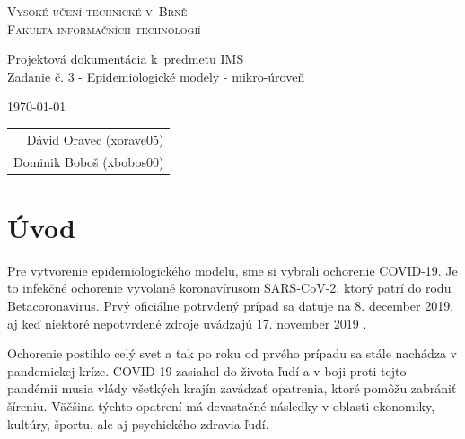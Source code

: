 \documentclass[a4paper, 11pt]{article}
\begin{document}
	\begin{titlepage}
		\begin{center}
			\Huge
			\textsc{Vysoké učení technické v~Brně} \\
			\huge
			\textsc{Fakulta informačních technologií} \\
			\begin{figure}[h]
                \centering
            \end{figure}
			\LARGE
			Projektová dokumentácia k~predmetu IMS \\
			\Huge
			Zadanie č. 3 - Epidemiologické modely - mikro-úroveň
		\end{center}

		{\Large
			\today
			\hfill
			\begin{tabular}{r}
			Dávid Oravec (xorave05) \\
			Dominik Boboš (xbobos00)
			\end{tabular}
		}
	\end{titlepage}
	\newpage
	
	\tableofcontents
	\newpage
	
	\section{Úvod}
	\par Pre vytvorenie epidemiologického modelu, sme si vybrali ochorenie COVID-19. Je to infekčné ochorenie vyvolané koronavírusom SARS-CoV-2, ktorý patrí do rodu Betacoronavirus. Prvý oficiálne potrvdený prípad sa datuje na 8. december 2019, aj keď niektoré nepotvrdené zdroje uvádzajú 17. november 2019 \cite{guardian}.
	\newline
	
	\par Ochorenie postihlo celý svet a tak po roku od prvého prípadu sa stále nachádza v pandemickej kríze. COVID-19 zasiahol do života ľudí a v boji proti tejto pandémii musia vlády všetkých krajín zavádzať opatrenia, ktoré pomôžu zabrániť šíreniu. Väčšina týchto opatrení má devastačné následky v oblasti ekonomiky, kultúry, športu, ale aj psychického zdravia ľudí.
	\newline
	
\end{document}
